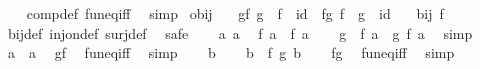 \begin{isabellebody}
%
\isadelimproof
\ \ %
\endisadelimproof
%
\isatagproof
{}\isamarkupfalse%
\ comp{\isacharunderscore}{\kern0pt}def\ fun{\isacharunderscore}{\kern0pt}eq{\isacharunderscore}{\kern0pt}iff\ \isamarkupfalse%
\ simp%
\endisatagproof
{\isafoldproof}%
%
\isadelimproof
\isanewline
%
\endisadelimproof
\isanewline
{}\isamarkupfalse%
\ o{\isacharunderscore}{\kern0pt}bij{\isacharcolon}{\kern0pt}\isanewline
\ \ \ gf{\isacharcolon}{\kern0pt}\ {\isachardoublequoteopen}g\ {\isasymcirc}\ f\ {\isacharequal}{\kern0pt}\ id{\isachardoublequoteclose}\ \ fg{\isacharcolon}{\kern0pt}\ {\isachardoublequoteopen}f\ {\isasymcirc}\ g\ {\isacharequal}{\kern0pt}\ id{\isachardoublequoteclose}\isanewline
\ \ \ {\isachardoublequoteopen}bij\ f{\isachardoublequoteclose}\isanewline
%
\isadelimproof
%
\endisadelimproof
%
\isatagproof
{}\isamarkupfalse%
\ bij{\isacharunderscore}{\kern0pt}def\ inj{\isacharunderscore}{\kern0pt}on{\isacharunderscore}{\kern0pt}def\ surj{\isacharunderscore}{\kern0pt}def\ \isamarkupfalse%
\ safe\isanewline
\ \ \isamarkupfalse%
\ a{}\ a{}\ \isamarkupfalse%
\ {\isachardoublequoteopen}f\ a{}\ {\isacharequal}{\kern0pt}\ f\ a{}{\isachardoublequoteclose}\isanewline
\ \ \isamarkupfalse%
\ {\isachardoublequoteopen}g\ {\isacharparenleft}{\kern0pt}\ f\ a{}{\isacharparenright}{\kern0pt}\ {\isacharequal}{\kern0pt}\ g\ {\isacharparenleft}{\kern0pt}f\ a{}{\isacharparenright}{\kern0pt}{\isachardoublequoteclose}\ \isamarkupfalse%
\ simp\isanewline
\ \ \isamarkupfalse%
\ {\isachardoublequoteopen}a{}\ {\isacharequal}{\kern0pt}\ a{}{\isachardoublequoteclose}\ \isamarkupfalse%
\ gf\ \isamarkupfalse%
\ fun{\isacharunderscore}{\kern0pt}eq{\isacharunderscore}{\kern0pt}iff\ \isamarkupfalse%
\ simp\isanewline
{}\isamarkupfalse%
\isanewline
\ \ \isamarkupfalse%
\ b\isanewline
\ \ \isamarkupfalse%
\ {\isachardoublequoteopen}b\ {\isacharequal}{\kern0pt}\ f\ {\isacharparenleft}{\kern0pt}g\ b{\isacharparenright}{\kern0pt}{\isachardoublequoteclose}\isanewline
\ \ \isamarkupfalse%
\ fg\ \isamarkupfalse%
\ fun{\isacharunderscore}{\kern0pt}eq{\isacharunderscore}{\kern0pt}iff\ \isamarkupfalse%
\ simp\isanewline
\ \ \isamarkupfalse%

\end{isabellebody}
